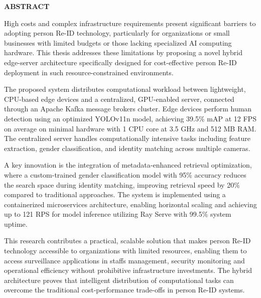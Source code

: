 \documentclass[../main.tex]{subfiles}
\begin{document}
\begin{center}
    \Large{\textbf{ABSTRACT}}\\
\end{center}
\vspace{1cm}

High costs and complex infrastructure requirements present significant barriers to adopting person Re-ID technology, particularly for organizations or small businesses with limited budgets or those lacking specialized AI computing hardware. This thesis addresses these limitations by proposing a novel hybrid edge-server architecture specifically designed for cost-effective person Re-ID deployment in such resource-constrained environments.

The proposed system distributes computational workload between lightweight, CPU-based edge devices and a centralized, GPU-enabled server, connected through an Apache Kafka message brokers cluster. Edge devices perform human detection using an optimized YOLOv11n model, achieving 39.5\% mAP at 12 FPS on average on minimal hardware with 1 CPU core at 3.5 GHz and 512 MB RAM. The centralized server handles computationally intensive tasks including feature extraction, gender classification, and identity matching across multiple cameras.

A key innovation is the integration of metadata-enhanced retrieval optimization, where a custom-trained gender classification model with 95\% accuracy reduces the search space during identity matching, improving retrieval speed by 20\% compared to traditional approaches. The system is implemented using a containerized microservices architecture, enabling horizontal scaling and achieving up to 121 RPS for model inference utilizing Ray Serve with 99.5\% system uptime.

This research contributes a practical, scalable solution that makes person Re-ID technology accessible to organizations with limited resources, enabling them to access surveillance applications in staffs management, security monitoring and operational efficiency without prohibitive infrastructure investments. The hybrid architecture proves that intelligent distribution of computational tasks can overcome the traditional cost-performance trade-offs in person Re-ID systems.
\end{document}

